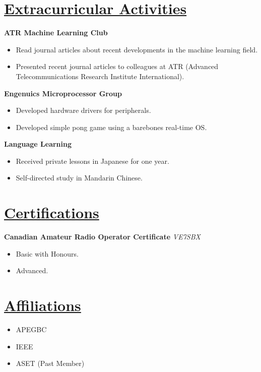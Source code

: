 \documentclass[a4paper, 11pt]{article}
\begin{document}
\section{\underline{Extracurricular Activities}}
  \textbf{ATR Machine Learning Club}
  \begin{itemize}[nosep]
    \item Read journal articles about recent developments in the machine learning field.
    \item Presented recent journal articles to colleagues at ATR (Advanced Telecommunications Research Institute International).
  \end{itemize}
  \medskip
      
  \textbf{Engenuics Microprocessor Group}
  \begin{itemize}[nosep]
    \item Developed hardware drivers for peripherals.
    \item Developed simple pong game using a barebones real-time OS.
  \end{itemize}
  \medskip
      
  \textbf{Language Learning}
  \begin{itemize}[nosep]
    \item Received private lessons in Japanese for one year.
    \item Self-directed study in Mandarin Chinese.
  \end{itemize}

\section{\underline{Certifications}}
  \textbf{Canadian Amateur Radio Operator Certificate}
  \hfill
  \emph{VE7SBX}
  \begin{itemize}[nosep]
    \item Basic with Honours.
    \item Advanced.
  \end{itemize}
      
\section{\underline{Affiliations}}
  \begin{itemize}[nosep]
    \item APEGBC
    \item IEEE
    \item ASET (Past Member)
  \end{itemize}
\end{document}
